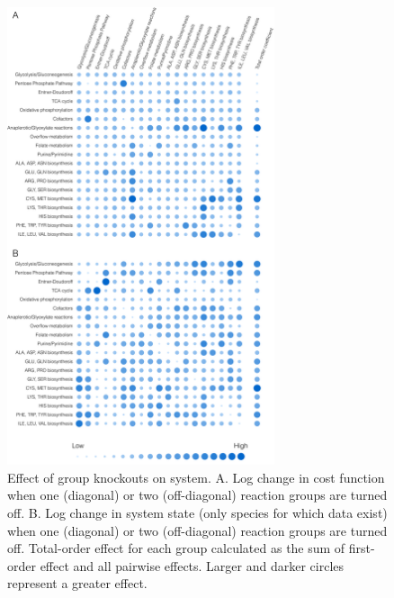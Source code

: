 \documentclass[12pt]{article}
\begin{document}
\begin{figure}[ht]
\centering
\includegraphics[width=0.7\textwidth]{./Figures/GroupKO.pdf}
\caption{Effect of group knockouts on system. A. Log change in cost function when one (diagonal) or two (off-diagonal) reaction groups are turned off. B. Log change in system state (only species for which data exist) when one (diagonal) or two (off-diagonal) reaction groups are turned off. Total-order effect  for each group calculated as the sum of first-order effect and all pairwise effects. Larger and darker circles represent a greater effect.}
\label{fig:GroupKO}
\end{figure}
\end{document}
